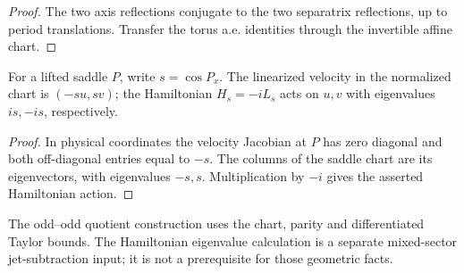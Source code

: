 \begin{proof}
\leanok
The two axis reflections conjugate to the two separatrix reflections,
up to period translations. Transfer the torus a.e. identities through
the invertible affine chart.
\end{proof}

\begin{corollary}
\label{cor:saddle-linearization}
\leanok
For a lifted saddle $P$, write $s=\cos P_x$. The linearized velocity in
the normalized chart is $(-su,sv)$; the Hamiltonian $H_s=-iL_s$ acts
on $u,v$ with eigenvalues $is,-is$, respectively.
\end{corollary}

\begin{proof}
\leanok
In physical coordinates the velocity Jacobian at $P$ has zero diagonal
and both off-diagonal entries equal to $-s$. The columns of the saddle
chart are its eigenvectors, with eigenvalues $-s,s$. Multiplication by
$-i$ gives the asserted Hamiltonian action.
\end{proof}

\begin{remark}
The odd--odd quotient construction uses the chart, parity and differentiated
Taylor bounds. The Hamiltonian eigenvalue calculation is a separate
mixed-sector jet-subtraction input; it is not a prerequisite for those
geometric facts.
\end{remark}
